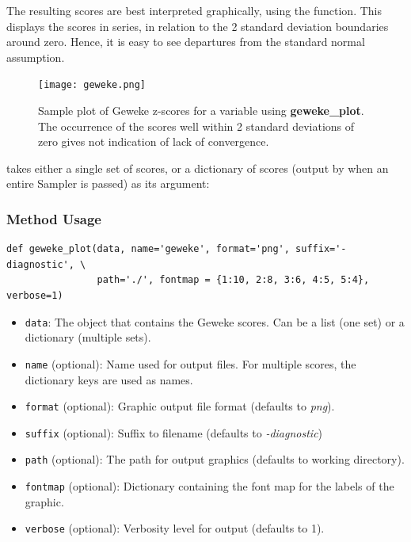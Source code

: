 The resulting scores are best interpreted graphically, using the  function. This displays the scores in series, in relation to the 2 standard deviation boundaries around zero. Hence, it is easy to see departures from the standard normal assumption.

\begin{figure}[ht]
\begin{center}
\texttt{[image: geweke.png]}
\caption{Sample plot of Geweke z-scores for a variable using \textbf{geweke_plot}. The occurrence of the scores well within 2 standard deviations of zero gives not indication of lack of convergence.}
\label{fig:geweke}
\end{center}
\end{figure}

 takes either a single set of scores, or a dictionary of scores (output by  when an entire Sampler is passed) as its argument:

\subsubsection*{Method Usage}
\begin{verbatim}
def geweke_plot(data, name='geweke', format='png', suffix='-diagnostic', \
                path='./', fontmap = {1:10, 2:8, 3:6, 4:5, 5:4}, verbose=1)
\end{verbatim}
\begin{itemize}
	
\item \verb=data=: The object that contains the Geweke scores. Can be a list (one set) or a dictionary (multiple sets).

\item \verb=name= (optional): Name used for output files. For multiple scores, the dictionary keys are used as names.

\item \verb=format= (optional): Graphic output file format (defaults to \emph{png}).

\item \verb=suffix= (optional): Suffix to filename (defaults to \emph{-diagnostic})

\item \verb=path= (optional): The path for output graphics (defaults to working directory).

\item \verb=fontmap= (optional): Dictionary containing the font map for the labels of the graphic.

\item \verb=verbose= (optional): Verbosity level for output (defaults to 1).
\end{itemize}

